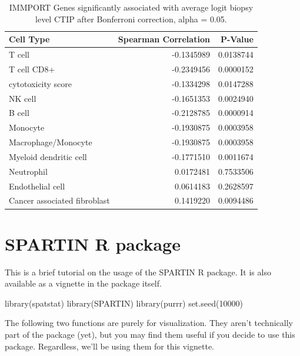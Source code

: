 \documentclass[
]{book}
\newenvironment{Shaded}{\begin{snugshade}}{\end{snugshade}}
\newcommand{\DecValTok}[1]{\textcolor[rgb]{0.00,0.00,0.81}{#1}}
\newcommand{\FunctionTok}[1]{\textcolor[rgb]{0.00,0.00,0.00}{#1}}
\newcommand{\NormalTok}[1]{#1}
\begin{document}
\begin{table}

\caption{\label{tab:MCPSpearman}IMMPORT Genes significantly associated with average logit biopsy level CTIP after Bonferroni correction, alpha = 0.05.}
\centering
\begin{tabular}[t]{l|r|r}
\hline
Cell Type & Spearman Correlation & P-Value\\
\hline
T cell & -0.1345989 & 0.0138744\\
\hline
T cell CD8+ & -0.2349456 & 0.0000152\\
\hline
cytotoxicity score & -0.1334298 & 0.0147288\\
\hline
NK cell & -0.1651353 & 0.0024940\\
\hline
B cell & -0.2128785 & 0.0000914\\
\hline
Monocyte & -0.1930875 & 0.0003958\\
\hline
Macrophage/Monocyte & -0.1930875 & 0.0003958\\
\hline
Myeloid dendritic cell & -0.1771510 & 0.0011674\\
\hline
Neutrophil & 0.0172481 & 0.7533506\\
\hline
Endothelial cell & 0.0614183 & 0.2628597\\
\hline
Cancer associated fibroblast & 0.1419220 & 0.0094486\\
\hline
\end{tabular}
\end{table}

\hypertarget{spartin-r-package}{%
\chapter{SPARTIN R package}\label{spartin-r-package}}

This is a brief tutorial on the usage of the SPARTIN R package. It is also available as a vignette in the package itself.

\begin{Shaded}
\begin{Highlighting}[]
\FunctionTok{library}\NormalTok{(spatstat)}
\FunctionTok{library}\NormalTok{(SPARTIN)}
\FunctionTok{library}\NormalTok{(purrr)}
\FunctionTok{set.seed}\NormalTok{(}\DecValTok{10000}\NormalTok{)}
\end{Highlighting}
\end{Shaded}

The following two functions are purely for visualization. They aren't technically part of the package (yet), but you may find them useful if you decide to use this package. Regardless, we'll be using them for this vignette.
\end{document}
